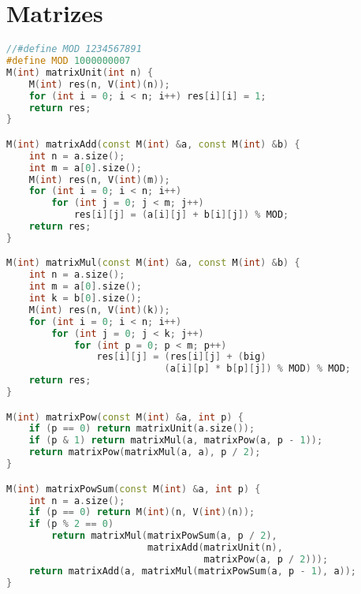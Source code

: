 \section{Matrizes}
\begin{lstlisting}[language=C++]
//#define MOD 1234567891
#define MOD 1000000007
M(int) matrixUnit(int n) {
    M(int) res(n, V(int)(n));
    for (int i = 0; i < n; i++) res[i][i] = 1;
    return res;
}

M(int) matrixAdd(const M(int) &a, const M(int) &b) {
    int n = a.size();
    int m = a[0].size();
    M(int) res(n, V(int)(m));
    for (int i = 0; i < n; i++)
        for (int j = 0; j < m; j++)
            res[i][j] = (a[i][j] + b[i][j]) % MOD;
    return res;
}

M(int) matrixMul(const M(int) &a, const M(int) &b) {
    int n = a.size();
    int m = a[0].size();
    int k = b[0].size();
    M(int) res(n, V(int)(k));
    for (int i = 0; i < n; i++)
        for (int j = 0; j < k; j++)
            for (int p = 0; p < m; p++)
                res[i][j] = (res[i][j] + (big)
                			(a[i][p] * b[p][j]) % MOD) % MOD;
    return res;
}

M(int) matrixPow(const M(int) &a, int p) {
    if (p == 0) return matrixUnit(a.size());
    if (p & 1) return matrixMul(a, matrixPow(a, p - 1));
    return matrixPow(matrixMul(a, a), p / 2);
}

M(int) matrixPowSum(const M(int) &a, int p) {
    int n = a.size();
    if (p == 0) return M(int)(n, V(int)(n));
    if (p % 2 == 0)
        return matrixMul(matrixPowSum(a, p / 2),
        				 matrixAdd(matrixUnit(n), 
                        		   matrixPow(a, p / 2)));
    return matrixAdd(a, matrixMul(matrixPowSum(a, p - 1), a));
}
\end{lstlisting}